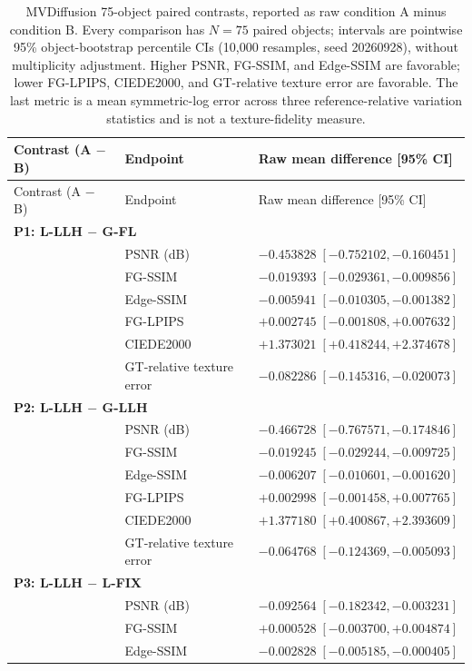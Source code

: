 \begingroup\scriptsize
\setlength{\tabcolsep}{3pt}
\begin{longtable}{p{4.0cm}p{3.1cm}p{7.2cm}}
\caption{MVDiffusion 75-object paired contrasts, reported as raw condition A minus condition B. Every comparison has $N=75$ paired objects; intervals are pointwise 95\% object-bootstrap percentile CIs (10,000 resamples, seed 20260928), without multiplicity adjustment. Higher PSNR, FG-SSIM, and Edge-SSIM are favorable; lower FG-LPIPS, CIEDE2000, and GT-relative texture error are favorable. The last metric is a mean symmetric-log error across three reference-relative variation statistics and is not a texture-fidelity measure.}\label{tab:mvdiffusion-raw-paired}\\
\toprule
Contrast (A $-$ B) & Endpoint & Raw mean difference [95\% CI] \\
\midrule\endfirsthead
\toprule Contrast (A $-$ B) & Endpoint & Raw mean difference [95\% CI] \\
\midrule\endhead
\multicolumn{3}{l}{\textbf{P1: L-LLH $-$ G-FL}}\\
& PSNR (dB) & $-0.453828\;[-0.752102,-0.160451]$ \\
& FG-SSIM & $-0.019393\;[-0.029361,-0.009856]$ \\
& Edge-SSIM & $-0.005941\;[-0.010305,-0.001382]$ \\
& FG-LPIPS & $+0.002745\;[-0.001808,+0.007632]$ \\
& CIEDE2000 & $+1.373021\;[+0.418244,+2.374678]$ \\
& GT-relative texture error & $-0.082286\;[-0.145316,-0.020073]$ \\
\multicolumn{3}{l}{\textbf{P2: L-LLH $-$ G-LLH}}\\
& PSNR (dB) & $-0.466728\;[-0.767571,-0.174846]$ \\
& FG-SSIM & $-0.019245\;[-0.029244,-0.009725]$ \\
& Edge-SSIM & $-0.006207\;[-0.010601,-0.001620]$ \\
& FG-LPIPS & $+0.002998\;[-0.001458,+0.007765]$ \\
& CIEDE2000 & $+1.377180\;[+0.400867,+2.393609]$ \\
& GT-relative texture error & $-0.064768\;[-0.124369,-0.005093]$ \\
\multicolumn{3}{l}{\textbf{P3: L-LLH $-$ L-FIX}}\\
& PSNR (dB) & $-0.092564\;[-0.182342,-0.003231]$ \\
& FG-SSIM & $+0.000528\;[-0.003700,+0.004874]$ \\
& Edge-SSIM & $-0.002828\;[-0.005185,-0.000405]$ \\

\end{longtable}
